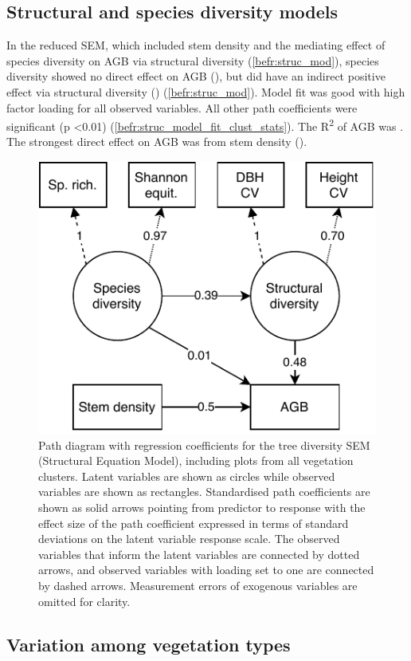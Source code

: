 \begin{refsection}
\subsection{Structural and species diversity models}
\label{befr:ssec:struc}

In the reduced SEM, which included stem density and the mediating effect of species diversity on AGB via structural diversity (\autoref{befr:struc_mod}), species diversity showed no direct effect on AGB (\strucbetadb{}), but did have an indirect positive effect via structural diversity (\strucbetadib{}) (\autoref{befr:struc_mod}). Model fit was good with high factor loading for all observed variables. All other path coefficients were significant (p <0.01) (\autoref{befr:struc_model_fit_clust_stats}). The R\textsuperscript{2} of AGB was \strucrsq{}. The strongest direct effect on AGB was from stem density (\strucbetaib{}).



\begin{figure}
	\includegraphics[width=0.5\linewidth]{img/struc.drawio}
	\caption[Path diagram for vegetation type model]{Path diagram with regression coefficients for the tree diversity SEM (Structural Equation Model), including plots from all vegetation clusters. Latent variables are shown as circles while observed variables are shown as rectangles. Standardised path coefficients are shown as solid arrows pointing from predictor to response with the effect size of the path coefficient expressed in terms of standard deviations on the latent variable response scale. The observed variables that inform the latent variables are connected by dotted arrows, and observed variables with loading set to one are connected by dashed arrows. Measurement errors of exogenous variables are omitted for clarity.}
	\label{befr:struc_mod}
\end{figure}

\subsection{Variation among vegetation types}
\label{befr:ssec:veg}


\end{refsection}
